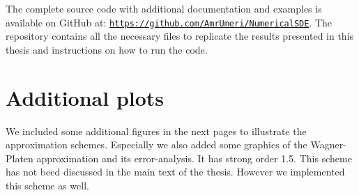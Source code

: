 The complete source code with additional documentation and examples is available on GitHub at: \href{https://github.com/AmrUmeri/NumericalSDE}{\texttt{https://github.com/AmrUmeri/NumericalSDE}}. The repository contains all the necessary files to replicate the results presented in this thesis and instructions on how to run the code.

 
%
%
%
%
%
%
%
%
%
%


\chapter{Additional plots}
\label{Graphics}
We included some additional figures in the next pages to illustrate the approximation schemes. Especially we also added some graphics of the Wagner-Platen approximation and its error-analysis. It has strong order 1.5. This scheme has not beed discussed in the main text of the thesis. However we implemented this scheme as well.


